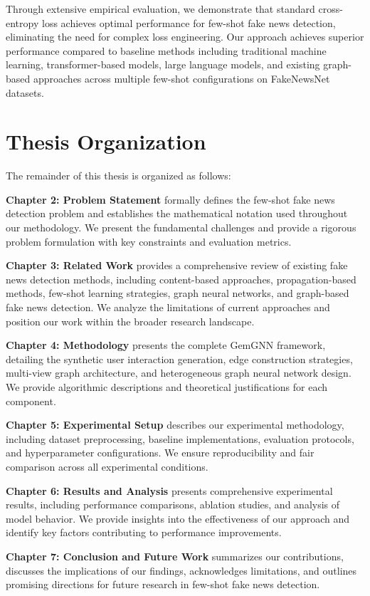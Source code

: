 Through extensive empirical evaluation, we demonstrate that standard cross-entropy loss achieves optimal performance for few-shot fake news detection, eliminating the need for complex loss engineering. Our approach achieves superior performance compared to baseline methods including traditional machine learning, transformer-based models, large language models, and existing graph-based approaches across multiple few-shot configurations on FakeNewsNet datasets.

\section{Thesis Organization}

The remainder of this thesis is organized as follows:

\textbf{Chapter 2: Problem Statement} formally defines the few-shot fake news detection problem and establishes the mathematical notation used throughout our methodology. We present the fundamental challenges and provide a rigorous problem formulation with key constraints and evaluation metrics.

\textbf{Chapter 3: Related Work} provides a comprehensive review of existing fake news detection methods, including content-based approaches, propagation-based methods, few-shot learning strategies, graph neural networks, and graph-based fake news detection. We analyze the limitations of current approaches and position our work within the broader research landscape.

\textbf{Chapter 4: Methodology} presents the complete GemGNN framework, detailing the synthetic user interaction generation, edge construction strategies, multi-view graph architecture, and heterogeneous graph neural network design. We provide algorithmic descriptions and theoretical justifications for each component.

\textbf{Chapter 5: Experimental Setup} describes our experimental methodology, including dataset preprocessing, baseline implementations, evaluation protocols, and hyperparameter configurations. We ensure reproducibility and fair comparison across all experimental conditions.

\textbf{Chapter 6: Results and Analysis} presents comprehensive experimental results, including performance comparisons, ablation studies, and analysis of model behavior. We provide insights into the effectiveness of our approach and identify key factors contributing to performance improvements.

\textbf{Chapter 7: Conclusion and Future Work} summarizes our contributions, discusses the implications of our findings, acknowledges limitations, and outlines promising directions for future research in few-shot fake news detection.

\EndChapter
